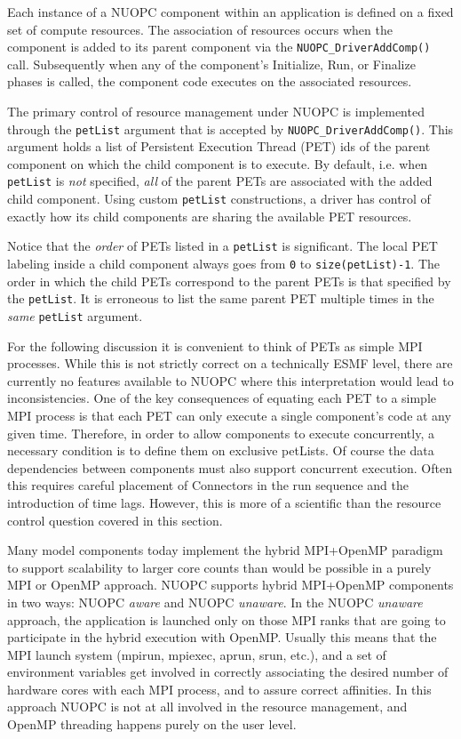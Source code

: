 %

\label{AdvancedResourceControl}

Each instance of a NUOPC component within an application is defined on a fixed set of compute resources. The association of resources occurs when the component is added to its parent component via the {\tt NUOPC\_DriverAddComp()} call. Subsequently when any of the component's Initialize, Run, or Finalize phases is called, the component code executes on the associated resources.

The primary control of resource management under NUOPC is implemented through the {\tt petList} argument that is accepted by {\tt NUOPC\_DriverAddComp()}. This argument holds a list of Persistent Execution Thread (PET) ids of the parent component on which the child component is to execute. By default, i.e. when {\tt petList} is {\em not} specified, {\em all} of the parent PETs are associated with the added child component. Using custom {\tt petList} constructions, a driver has control of exactly how its child components are sharing the available PET resources.

Notice that the {\em order} of PETs listed in a {\tt petList} is significant. The local PET labeling inside a child component always goes from {\tt 0} to {\tt size(petList)-1}. The order in which the child PETs correspond to the parent PETs is that specified by the {\tt petList}. It is erroneous to list the same parent PET multiple times in the {\em same} {\tt petList} argument.

For the following discussion it is convenient to think of PETs as simple MPI processes. While this is not strictly correct on a technically ESMF level, there are currently no features available to NUOPC where this interpretation would lead to inconsistencies. One of the key consequences of equating each PET to a simple MPI process is that each PET can only execute a single component's code at any given time. Therefore, in order to allow components to execute concurrently, a necessary condition is to define them on exclusive petLists. Of course the data dependencies between components must also support concurrent execution. Often this requires careful placement of Connectors in the run sequence and the introduction of time lags. However, this is more of a scientific than the resource control question covered in this section.

Many model components today implement the hybrid MPI+OpenMP paradigm to support scalability to larger core counts than would be possible in a purely MPI or OpenMP approach. NUOPC supports hybrid MPI+OpenMP components in two ways: NUOPC {\em aware} and NUOPC {\em unaware}. In the NUOPC {\em unaware} approach, the application is launched only on those MPI ranks that are going to participate in the hybrid execution with OpenMP. Usually this means that the MPI launch system (mpirun, mpiexec, aprun, srun, etc.), and a set of environment variables get involved in correctly associating the desired number of hardware cores with each MPI process, and to assure correct affinities. In this approach NUOPC is not at all involved in the resource management, and OpenMP threading happens purely on the user level.

